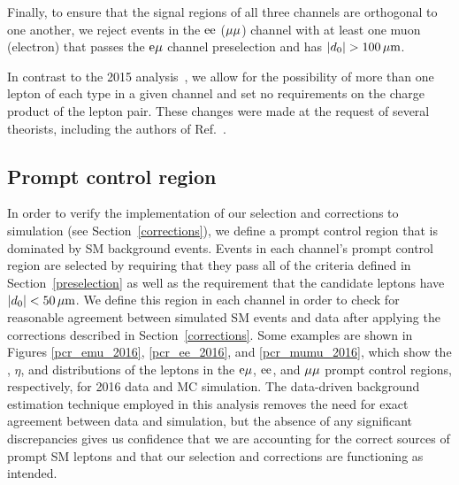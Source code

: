 Finally, to ensure that the signal regions of all three channels are orthogonal to one another, we reject events in the $\mathrm{e}\mathrm{e}$ (${\mu}{\mu}$) channel with at least one muon (electron) that passes the $\mathrm{e}{\mu}$ channel preselection and has $\lvert d_0 \rvert>100\,\mu\text{m}$.

In contrast to the 2015 analysis~\cite{CMS:DisplacedEMu}, we allow for the possibility of more than one lepton of each type in a given channel and set no requirements on the charge product of the lepton pair. These changes were made at the request of several theorists, including the authors of Ref.~\cite{Evans:2016zau}.

\subsection{Prompt control region}
\label{pcr}
In order to verify the implementation of our selection and corrections to simulation (see Section~\ref{corrections}), we define a prompt control region that is dominated by SM background events. Events in each channel's prompt control region are selected by requiring that they pass all of the criteria defined in Section~\ref{preselection} as well as the requirement that the candidate leptons have $\lvert d_0 \rvert<50\,\mu\text{m}$. We define this region in each channel in order to check for reasonable agreement between simulated SM events and data after applying the corrections described in Section~\ref{corrections}. Some examples are shown in Figures \ref{pcr_emu_2016}, \ref{pcr_ee_2016}, and \ref{pcr_mumu_2016}, which show the \pt, $\eta$, and \ad distributions of the leptons in the $\mathrm{e}{\mu}$, $\mathrm{e}\mathrm{e}$, and ${\mu}{\mu}$ prompt control regions, respectively, for 2016 data and MC simulation. The data-driven background estimation technique employed in this analysis removes the need for exact agreement between data and simulation, but the absence of any significant discrepancies gives us confidence that we are accounting for the correct sources of prompt SM leptons and that our selection and corrections are functioning as intended.





